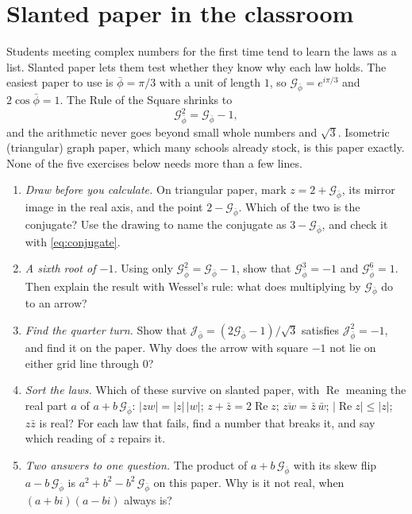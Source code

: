\documentclass[11pt,a4paper]{article}
\theoremstyle{plain}
\theoremstyle{definition}
\newcommand{\pb}{\bar{\phi}}                     %
\newcommand{\Gp}{\mathcal{G}_{\bar{\phi}}}       %
\newcommand{\Jp}{\mathcal{J}_{\bar{\phi}}}       %
\renewcommand{\Re}{\operatorname{Re}}
\begin{document}
\section{Slanted paper in the classroom}\label{sec:classroom}

Students meeting complex numbers for the first time tend to learn the laws as a list. Slanted paper lets them test whether they know why each law holds. The easiest paper to use is $\pb = \pi/3$ with a unit of length $1$, so $\Gp = e^{i\pi/3}$ and $2\cos\pb = 1$. The Rule of the Square shrinks to
\[
\Gp^2 = \Gp - 1 ,
\]
and the arithmetic never goes beyond small whole numbers and $\sqrt 3$. Isometric (triangular) graph paper, which many schools already stock, is this paper exactly. None of the five exercises below needs more than a few lines.

\begin{enumerate}
  \item \emph{Draw before you calculate.} On triangular paper, mark $z = 2 + \Gp$, its mirror image in the real axis, and the point $2 - \Gp$. Which of the two is the conjugate? Use the drawing to name the conjugate as $3 - \Gp$, and check it with \eqref{eq:conjugate}.
  \item \emph{A sixth root of $-1$.} Using only $\Gp^2 = \Gp - 1$, show that $\Gp^3 = -1$ and $\Gp^6 = 1$. Then explain the result with Wessel's rule: what does multiplying by $\Gp$ do to an arrow?
  \item \emph{Find the quarter turn.} Show that $\Jp = (2\Gp - 1)/\sqrt 3$ satisfies $\Jp^2 = -1$, and find it on the paper. Why does the arrow with square $-1$ not lie on either grid line through $0$?
  \item \emph{Sort the laws.} Which of these survive on slanted paper, with $\Re$ meaning the real part $a$ of $a + b\,\Gp$: $\lvert zw\rvert = \lvert z\rvert\,\lvert w\rvert$; $z + \bar z = 2\Re z$; $\overline{zw} = \bar z\,\bar w$; $\lvert\Re z\rvert \le \lvert z\rvert$; $z\bar z$ is real? For each law that fails, find a number that breaks it, and say which reading of $z$ repairs it.
  \item \emph{Two answers to one question.} The product of $a + b\,\Gp$ with its skew flip $a - b\,\Gp$ is $a^2 + b^2 - b^2\,\Gp$ on this paper. Why is it not real, when $(a + bi)(a - bi)$ always is?
\end{enumerate}
\end{document}
